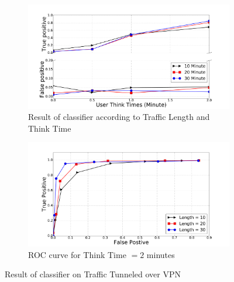 \begin{figure}[!t]
\begin{subfigure}{.48\linewidth}
\centering
\includegraphics[width=\linewidth]{image/jan25/vpn_d2u.pdf}
\caption{Result of  classifier according to Traffic Length and Think Time}
\label{fig:tp}
\end{subfigure}
\centering
\begin{subfigure}{.48\linewidth}
\includegraphics[width=\linewidth]{image/jan25/roc_vpn_d2u.pdf}
\caption{ROC curve for Think Time $=2$ minutes}
\label{fig:fp}
\end{subfigure}
\caption{Result of  classifier on \bc Traffic Tunneled over VPN}
\label{fig:vpn}
\end{figure}
\fi



















